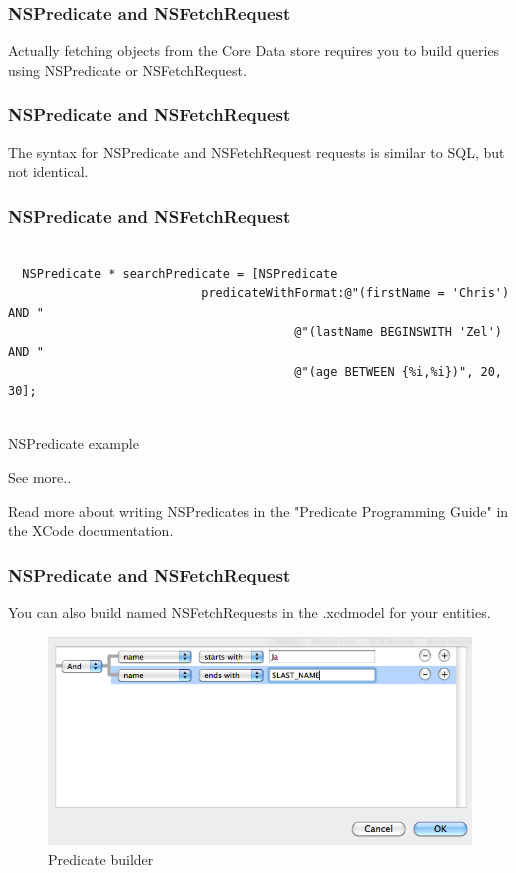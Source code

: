 \documentclass[10pt]{beamer}
\begin{document}
    
\begin{frame}[fragile]
  \frametitle{NSPredicate and NSFetchRequest}
  Actually fetching objects from the Core Data store requires you to build queries using NSPredicate or NSFetchRequest.

\end{frame}

\begin{frame}[fragile]
  \frametitle{NSPredicate and NSFetchRequest}
  The syntax for NSPredicate and NSFetchRequest requests is similar to SQL, but not identical.

\end{frame}

\begin{frame}[fragile]
  \frametitle{NSPredicate and NSFetchRequest}
  \begin{listing}[H]
    \begin{verbatim}
  
  NSPredicate * searchPredicate = [NSPredicate
                           predicateWithFormat:@"(firstName = 'Chris') AND "
                                        @"(lastName BEGINSWITH 'Zel') AND "
                                        @"(age BETWEEN {%i,%i})", 20, 30];
                
  \end{verbatim}
    \caption{NSPredicate example}
    \label{listing:41}
  \end{listing}
\begin{block}{See more..}
  
  Read more about writing NSPredicates in the "Predicate Programming Guide" in
  the XCode documentation.
                
  \end{block}

\end{frame}

\begin{frame}[fragile]
  \frametitle{NSPredicate and NSFetchRequest}
  You can also build named NSFetchRequests in the .xcdmodel for your entities. \begin{figure}[htb]
  \begin{center}
  
  \includegraphics[scale=0.5]{PredicateBuilder.png}
                
  \caption{Predicate builder}
  \end{center}
  \end{figure}

\end{frame}
\end{document}
